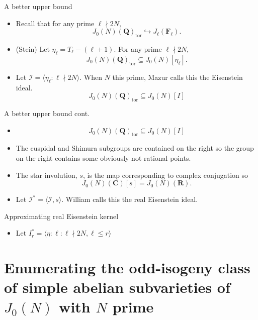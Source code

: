 \documentclass{beamer}
\newcommand{\QQ}{\mathbf{Q}}
\newcommand{\RR}{\mathbf{R}}
\newcommand{\F}{\mathbf{F}}
\newcommand{\I}{\mathcal{I}}
\newcommand{\CC}{\mathbf{C}}
\newcommand{\tor}{\mathrm{tor}}
\begin{document}
\begin{frame}{A better upper bound}
    \begin{itemize}
        \item 
            Recall that for any prime $\ell\nmid 2N$,
            \[
                J_0(N)(\QQ)_\tor\hookrightarrow J_\ell(\F_\ell).
            \]
        \item
            (Stein) Let $\eta_\ell = T_\ell - (\ell+1)$. For any prime
            $\ell\nmid 2N$,
            \[
                J_0(N)(\QQ)_\tor\subseteq J_0(N)[\eta_\ell].
            \]
        \item
            Let $\mathcal{I} = \langle \eta_\ell:\ell\nmid 2N\rangle$. When $N$
            this prime, Mazur calls this the Eisenstein ideal.
            \[
                J_0(N)(\QQ)_\tor \subseteq J_0(N)[I]
            \]
    \end{itemize} 
\end{frame}

\begin{frame}{A better upper bound cont.}
    \begin{itemize}
        \item
            \[
                J_0(N)(\QQ)_\tor \subseteq J_0(N)[I]
            \]
        \item
            The cuspidal and Shimura subgroups are contained on the right so
            the group on the right contains some obviously not rational points.
        \item
            The star involution, $s$, is the map corresponding to complex
            conjugation so
            \[
                J_0(N)(\CC)[s] = J_0(N)(\RR).
            \]
        \item
            Let $\I^* = \langle \I, s \rangle$. William calls this the real
            Eisenstein ideal.
   \end{itemize} 
\end{frame}

\begin{frame}{Approximating real Eisenstein kernel}
    \begin{itemize}
        \item
            Let $I_r ^*= \langle \eta:\ell:\ell\nmid 2N, \ell \leq r \rangle$
    \end{itemize}
\end{frame}

\section{Enumerating the odd-isogeny class of simple abelian subvarieties of
$J_0(N)$ with $N$ prime}

    
\end{document}
